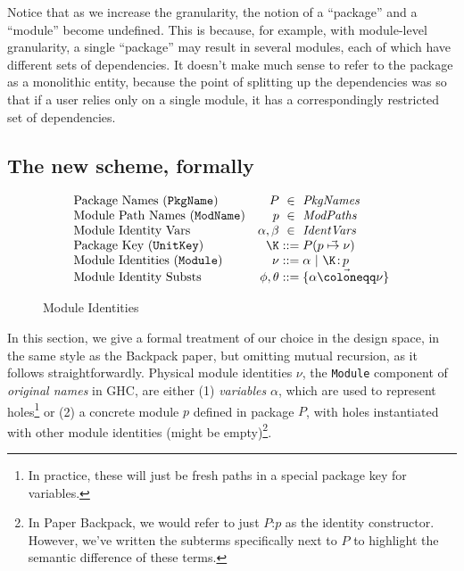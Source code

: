 \documentclass{article}
\begin{document}
Notice that as we increase the granularity, the notion of a ``package'' and a ``module''
become undefined.  This is because, for example, with module-level granularity, a single
``package'' may result in several modules, each of which have different sets of
dependencies.  It doesn't make much sense to refer to the package as a monolithic entity,
because the point of splitting up the dependencies was so that if a user relies only
on a single module, it has a correspondingly restricted set of dependencies.
\subsection{The new scheme, formally}

\begin{wrapfigure}{R}{0.5\textwidth}
\begin{myfig}
\[
\begin{array}{@{}lr@{\;}c@{\;}l@{}}
    \text{Package Names (\texttt{PkgName})} & P &\in& \mathit{PkgNames} \\
    \text{Module Path Names (\texttt{ModName})} & p &\in& \mathit{ModPaths} \\
    \text{Module Identity Vars} & \alpha,\beta &\in& \mathit{IdentVars} \\
    \text{Package Key (\texttt{UnitKey})} & \K &::=& P(\vec{p\mapsto\nu}) \\
    \text{Module Identities (\texttt{Module})} & \nu &::=&
      \alpha ~|~
      \K\colon\! p \\
    \text{Module Identity Substs} & \phi,\theta &::=&
      \{\vec{\alpha \coloneqq \nu}\} \\
\end{array}
\]
\caption{Module Identities}
\label{fig:mod-idents}
\end{myfig}
\end{wrapfigure}

In this section, we give a formal treatment of our choice in the design space, in the
same style as the Backpack paper, but omitting mutual recursion, as it follows straightforwardly.
Physical module
identities $\nu$, the \texttt{Module} component of \emph{original names} in GHC, are either (1) \emph{variables} $\alpha$, which are
used to represent holes\footnote{In practice, these will just be fresh paths in a special package key for variables.} or (2) a concrete module $p$ defined in package
$P$, with holes instantiated with other module identities (might be
empty)\footnote{In Paper Backpack, we would refer to just $P$:$p$ as the identity
constructor.  However, we've written the subterms specifically next to $P$ to highlight the semantic difference of these terms.}.
\end{document}
